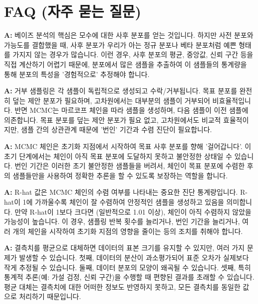 \documentclass[11pt,a4paper]{book}
\providecommand{\newsection}{\section}
\theoremstyle{definition}
\begin{document}
\newsection{FAQ (자주 묻는 질문)}

\begin{tcolorbox}[infobox, title={Q: 왜 베이즈 분석에서 사후 분포를 샘플링해야 하나요?}]
\textbf{A:} 베이즈 분석의 핵심은 모수에 대한 사후 분포를 얻는 것입니다. 하지만 사전 분포와 가능도를 결합했을 때, 사후 분포가 우리가 아는 정규 분포나 베타 분포처럼 예쁜 형태를 가지지 않는 경우가 많습니다. 이런 경우, 사후 분포의 평균, 중앙값, 신뢰 구간 등을 직접 계산하기 어렵기 때문에, 분포에서 많은 샘플을 추출하여 이 샘플들의 통계량을 통해 분포의 특성을 '경험적으로' 추정해야 합니다.
\end{tcolorbox}

\begin{tcolorbox}[infobox, title={Q: 거부 샘플링과 MCMC의 주요 차이점은 무엇인가요?}]
\textbf{A:} 거부 샘플링은 각 샘플이 독립적으로 생성되고 수락/거부됩니다. 목표 분포를 완전히 덮는 제안 분포가 필요하며, 고차원에서는 대부분의 샘플이 거부되어 비효율적입니다. 반면 MCMC는 마르코프 체인을 따라 샘플을 생성하며, 다음 샘플이 이전 샘플에 의존합니다. 목표 분포를 덮는 제안 분포가 필요 없고, 고차원에서도 비교적 효율적이지만, 샘플 간의 상관관계 때문에 '번인' 기간과 수렴 진단이 필요합니다.
\end{tcolorbox}

\begin{tcolorbox}[infobox, title={Q: MCMC에서 '번인(Burn-in)' 기간은 왜 필요한가요?}]
\textbf{A:} MCMC 체인은 초기화 지점에서 시작하여 목표 사후 분포를 향해 '걸어갑니다'. 이 초기 단계에서는 체인이 아직 목표 분포에 도달하지 못하고 불안정한 상태일 수 있습니다. 번인 기간은 이러한 초기 불안정한 샘플들을 버려서, 체인이 목표 분포에 수렴한 후의 샘플들만을 사용하여 정확한 추론을 할 수 있도록 보장하는 역할을 합니다.
\end{tcolorbox}

\begin{tcolorbox}[infobox, title={Q: MCMC 결과에서 'R-hat' 값이 1보다 크면 어떻게 해야 하나요?}]
\textbf{A:} R-hat 값은 MCMC 체인의 수렴 여부를 나타내는 중요한 진단 통계량입니다. R-hat이 1에 가까울수록 체인이 잘 수렴하여 안정적인 샘플을 생성하고 있음을 의미합니다. 만약 R-hat이 1보다 크다면 (일반적으로 1.01 이상), 체인이 아직 수렴하지 않았을 가능성이 높습니다. 이 경우, 샘플링 반복 횟수를 늘리거나, 번인 기간을 늘리거나, 여러 개의 체인을 시작하여 초기화 지점의 영향을 줄이는 등의 조치를 취해야 합니다.
\end{tcolorbox}

\begin{tcolorbox}[infobox, title={Q: 결측치를 단순히 평균으로 대체하는 것이 왜 문제가 될 수 있나요?}]
\textbf{A:} 결측치를 평균으로 대체하면 데이터의 표본 크기를 유지할 수 있지만, 여러 가지 문제가 발생할 수 있습니다. 첫째, 데이터의 분산이 과소평가되어 표준 오차가 실제보다 작게 추정될 수 있습니다. 둘째, 데이터 분포의 모양이 왜곡될 수 있습니다. 셋째, 특히 통계적 추론(예: 가설 검정, 신뢰 구간)을 수행할 때 편향된 결과를 초래할 수 있습니다. 평균 대체는 결측치에 대한 어떠한 정보도 반영하지 못하고, 모든 결측치를 동일한 값으로 처리하기 때문입니다.
\end{tcolorbox}
\end{document}
